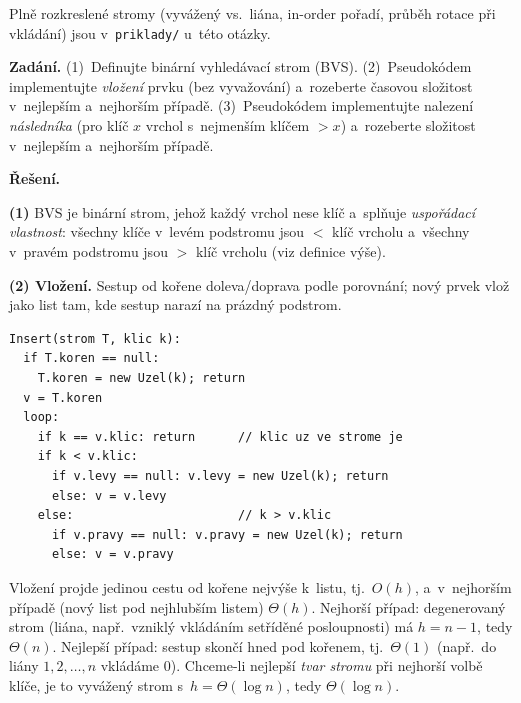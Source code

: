 \documentclass[11pt,a4paper]{article}
\begin{document}
\begin{poznamka}
Plně rozkreslené stromy (vyvážený vs.\ liána, in-order pořadí, průběh rotace při vkládání) jsou v~\texttt{priklady/} u~této otázky.
\end{poznamka}

\begin{priklad}
\par
\textbf{Zadání.} (1)~Definujte binární vyhledávací strom (BVS). (2)~Pseudokódem implementujte \emph{vložení} prvku (bez vyvažování) a~rozeberte časovou složitost v~nejlepším a~nejhorším případě. (3)~Pseudokódem implementujte nalezení \emph{následníka} (pro klíč $x$ vrchol s~nejmenším klíčem $>x$) a~rozeberte složitost v~nejlepším a~nejhorším případě.

\smallskip
\textbf{Řešení.}\par
\textbf{(1)} BVS je binární strom, jehož každý vrchol nese klíč a~splňuje \emph{uspořádací vlastnost}: všechny klíče v~levém podstromu jsou $<$ klíč vrcholu a~všechny v~pravém podstromu jsou $>$ klíč vrcholu (viz definice výše).

\textbf{(2) Vložení.} Sestup od kořene doleva/doprava podle porovnání; nový prvek vlož jako list tam, kde sestup narazí na prázdný podstrom.
\begin{lstlisting}
Insert(strom T, klic k):
  if T.koren == null:
    T.koren = new Uzel(k); return
  v = T.koren
  loop:
    if k == v.klic: return      // klic uz ve strome je
    if k < v.klic:
      if v.levy == null: v.levy = new Uzel(k); return
      else: v = v.levy
    else:                       // k > v.klic
      if v.pravy == null: v.pravy = new Uzel(k); return
      else: v = v.pravy
\end{lstlisting}
Vložení projde jedinou cestu od kořene nejvýše k~listu, tj.\ $O(h)$, a~v~nejhorším případě (nový list pod nejhlubším listem) $\Theta(h)$. Nejhorší případ: degenerovaný strom (liána, např.\ vzniklý vkládáním setříděné posloupnosti) má $h=n-1$, tedy $\boxed{\Theta(n)}$. Nejlepší případ: sestup skončí hned pod kořenem, tj.\ $\boxed{\Theta(1)}$ (např.\ do liány $1,2,\dots,n$ vkládáme $0$). Chceme-li nejlepší \emph{tvar stromu} při nejhorší volbě klíče, je to vyvážený strom s~$h=\Theta(\log n)$, tedy $\Theta(\log n)$.


\end{priklad}
\end{document}
